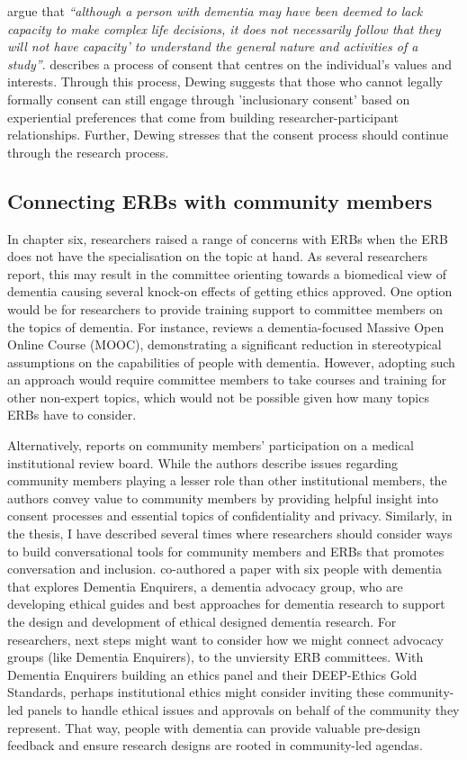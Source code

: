 \cite{o2021advocating} argue that \textit{``although a person with dementia may have been deemed to lack capacity to make complex life decisions, it does not necessarily follow that they will not have capacity' to understand the general nature and activities of a study''}. \cite{dewing_participatory_2007} describes a process of consent that centres on the individual's values and interests. Through this process, Dewing suggests that those who cannot legally formally consent can still engage through 'inclusionary consent' based on experiential preferences that come from building researcher-participant relationships. Further, Dewing stresses that the consent process should continue through the research process.

\subsection{Connecting ERBs with community members}
\label{ERBs-Community-Members}
In chapter six, researchers raised a range of concerns with ERBs when the ERB does not have the specialisation on the topic at hand. As several researchers report, this may result in the committee orienting towards a biomedical view of dementia causing several knock-on effects of getting ethics approved. One option would be for researchers to provide training support to committee members on the topics of dementia. For instance, \cite{goldberg2015relationship} reviews a dementia-focused Massive Open Online Course (MOOC), demonstrating a significant reduction in stereotypical assumptions on the capabilities of people with dementia. However, adopting such an approach would require committee members to take courses and training for other non-expert topics, which would not be possible given how many topics ERBs have to consider. 

Alternatively, \cite{lidz2012participation} reports on community members' participation on a medical institutional review board. While the authors describe issues regarding community members playing a lesser role than other institutional members, the authors convey value to community members by providing helpful insight into consent processes and essential topics of confidentiality and privacy. Similarly, in the thesis, I have described several times where researchers should consider ways to build conversational tools for community members and ERBs that promotes conversation and inclusion. \cite{davies2021dementia} co-authored a paper with six people with dementia that explores Dementia Enquirers, a dementia advocacy group, who are developing ethical guides and best approaches for dementia research to support the design and development of ethical designed dementia research. For researchers, next steps might want to consider how we might connect advocacy groups (like Dementia Enquirers), to the unviersity ERB committees. With Dementia Enquirers building an ethics panel and their DEEP-Ethics Gold Standards, perhaps institutional ethics might consider inviting these community-led panels to handle ethical issues and approvals on behalf of the community they represent. That way, people with dementia can provide valuable pre-design feedback and ensure research designs are rooted in community-led agendas. 


